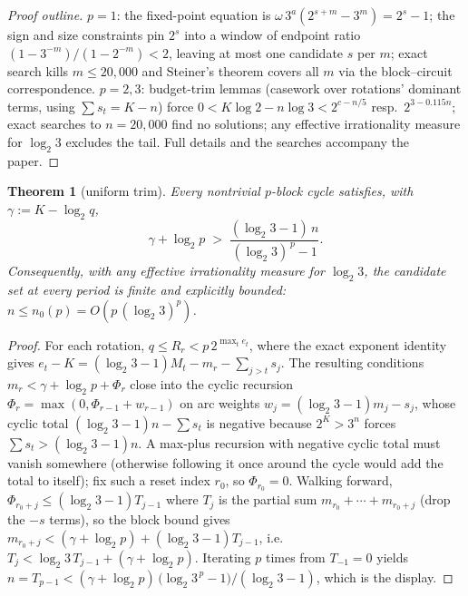 \documentclass[11pt]{article}
\newtheorem{theorem}{Theorem}[section]
\theoremstyle{remark}
\newcommand{\w}{\omega}
\newcommand{\LL}{\log_2 3}
\begin{document}
\begin{proof}[Proof outline]
$p=1$: the fixed-point equation is $\w\,3^a(2^{s+m}-3^m) = 2^s-1$; the sign and size constraints pin $2^s$ into a window of endpoint ratio $(1-3^{-m})/(1-2^{-m}) < 2$, leaving at most one candidate $s$ per $m$; exact search kills $m \le 20{,}000$ and Steiner's theorem \cite{steiner} covers all $m$ via the block--circuit correspondence. $p=2,3$: budget-trim lemmas (casework over rotations' dominant terms, using $\sum s_t = K - n$) force $0 < K\log2 - n\log3 < 2^{c-n/5}$ resp.\ $2^{3-0.115n}$; exact searches to $n = 20{,}000$ find no solutions; any effective irrationality measure for $\LL$ \cite{rhin} excludes the tail. Full details and the searches accompany the paper.
\end{proof}

\begin{theorem}[uniform trim]\label{thm:uniform}
Every nontrivial $p$-block cycle satisfies, with $\gamma := K - \log_2 q$,
\[ \gamma + \log_2 p \;>\; \frac{(\LL - 1)\, n}{(\LL)^{\,p} - 1}. \]
Consequently, with any effective irrationality measure for $\LL$, the candidate set at every period is finite and explicitly bounded: $n \le n_0(p) = O(p\,(\LL)^p)$.
\end{theorem}

\begin{proof}
For each rotation, $q \le R_r < p\,2^{\max_t e_t}$, where the exact exponent identity gives $e_t - K = (\LL-1)M_t - m_r - \sum_{j>t}s_j$. The resulting conditions $m_r < \gamma + \log_2 p + \Phi_r$ close into the cyclic recursion $\Phi_{r} = \max(0, \Phi_{r-1} + w_{r-1})$ on arc weights $w_j = (\LL-1)m_j - s_j$, whose cyclic total $(\LL-1)n - \sum s_t$ is negative because $2^K > 3^n$ forces $\sum s_t > (\LL - 1)n$. A max-plus recursion with negative cyclic total must vanish somewhere (otherwise following it once around the cycle would add the total to itself); fix such a reset index $r_0$, so $\Phi_{r_0} = 0$. Walking forward, $\Phi_{r_0+j} \le (\LL-1)T_{j-1}$ where $T_j$ is the partial sum $m_{r_0} + \cdots + m_{r_0+j}$ (drop the $-s$ terms), so the block bound gives $m_{r_0+j} < (\gamma + \log_2 p) + (\LL-1)T_{j-1}$, i.e.\ $T_j < \LL\,T_{j-1} + (\gamma + \log_2 p)$. Iterating $p$ times from $T_{-1} = 0$ yields $n = T_{p-1} < (\gamma + \log_2 p)\,\bigl(\LL^{\,p} - 1\bigr)/(\LL - 1)$, which is the display.
\end{proof}
\end{document}
